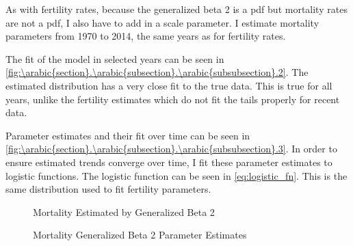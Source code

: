 \documentclass[10pt]{article}
\renewcommand{\thesection}{\arabic{section}}
\renewcommand{\thesubsection}{\thesection.\arabic{subsection}}
\renewcommand{\thesubsubsection}{\thesubsection.\arabic{subsubsection}}
\numberwithin{equation}{subsection}
\newcommand*{\FigureDir}{../../graphs}
\begin{document}
\par As with fertility rates, because the generalized beta 2 is a pdf but mortality rates are not a pdf, I also have to add in a scale parameter. I estimate mortality parameters from 1970 to 2014, the same years as for fertility rates.

\par The fit of the model in selected years can be seen in \autoref{fig:\thesubsubsection.2}. The estimated distribution has a very close fit to the true data. This is true for all years, unlike the fertility estimates which do not fit the tails properly for recent data.

\par Parameter estimates and their fit over time can be seen in \autoref{fig:\thesubsubsection.3}. In order to ensure estimated trends converge over time, I fit these parameter estimates to logistic functions. The logistic function can be seen in \ref{eq:logistic_fn}. This is the same distribution used to fit fertility parameters.

\begin{figure}[!ht]
   \centering
   \caption{\label{fig:\thesubsubsection.2}Mortality Estimated by Generalized Beta 2}
\end{figure}

\begin{figure}[!ht]
   \centering
   \caption{\label{fig:\thesubsubsection.3}Mortality Generalized Beta 2 Parameter Estimates}
\end{figure}
\end{document}
